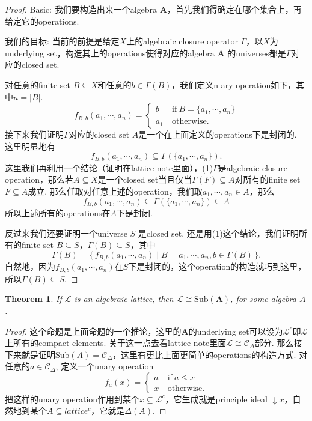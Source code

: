 \documentclass{article}
\newtheorem{theorem}{Theorem}[section]
\newcommand\Set[2]{\{\,#1\mid#2\,\}} %
\newcommand\lattice{\mathcal{L}}
\newcommand\algebra{\mathbf{A}}
\newcommand\Sub[1]{\text{Sub}(#1)}
\begin{document}
\begin{proof}
Basic: 我们要构造出来一个algebra $\algebra$，首先我们得确定在哪个集合上，再给定它的operations. 

我们的目标: 当前的前提是给定$X$上的algebraic closure operator $\Gamma$，以$X$为underlying set，构造其上的operations使得对应的algebra $\algebra$ 的universes都是$\Gamma$对应的closed set.

对任意的finite set $B \subseteq X$和任意的$b \in \Gamma(B)$，我们定义n-ary operation如下，其中$n = |B|$.
$$
f_{B,b}(a_1,\cdots,a_n) = \left\{
\begin{array}{ll} 
b \ & \text{if}\ B=\{a_1,\cdots,a_n\} \\ 
a_1\ & \text{otherwise}.  
\end{array}
\right.   
$$
接下来我们证明$\Gamma$对应的closed set $A$是一个在上面定义的operations下是封闭的. 这里明显地有
$$
f_{B,b}(a_1,\cdots,a_n) \subseteq \Gamma(\{a_1,\cdots,a_n\}).
$$
这里我们再利用一个结论（证明在lattice note里面），(1)$\Gamma$是algebraic closure operation，那么若$A \subseteq X$是一个closed set当且仅当$\Gamma(F) \subseteq A$对所有的finite set $F \subseteq A$成立. 那么任取对任意上述的operation，我们取$a_1,\cdots,a_n \in A$，那么
$$
f_{B,b}(a_1,\cdots,a_n) \subseteq \Gamma(\{a_1,\cdots,a_n\}) \subseteq A
$$
所以上述所有的operations在$A$下是封闭.

反过来我们还要证明一个universe $S$ 是closed set. 还是用(1)这个结论，我们证明所有的finite set $B \subseteq S$，$\Gamma(B) \subseteq S$，其中
$$
\Gamma(B) = \Set{f_{B,b}(a_1,\cdots,a_n)}{B={a_1,\cdots,a_n},b \in \Gamma(B)}.
$$
自然地，因为$f_{B,b}(a_1,\cdots,a_n)$在$S$下是封闭的，这个operation的构造就巧到这里，所以$\Gamma(B) \subseteq S$.
\end{proof}


\begin{theorem}
\rm If $\lattice$ is an algebraic lattice, then $\lattice \cong \Sub{\algebra}$, for some algebra $A$.
\end{theorem}

\begin{proof}
这个命题是上面命题的一个推论，这里的$\algebra$的underlying set可以设为$\lattice^c$即$\lattice$上所有的compact elements. 关于这一点去看lattice note里面$\lattice \cong \mathcal{C}_{\Delta}$部分. 那么接下来就是证明$\Sub{A} =  \mathcal{C}_{\Delta}$，这里有更比上面更简单的operations的构造方式. 对任意的$a \in \mathcal{C}_{\Delta}$, 定义一个unary operation
$$
f_{a}(x) = \left\{
\begin{array}{ll} 
a \ & \text{if}\ a \leq x \\ 
x\ & \text{otherwise}.  
\end{array}
\right.  
$$
把这样的unary operation作用到某个$x \subseteq \lattice^c$，它生成就是principle ideal $\downarrow x$，自然地到某个$A \subseteq lattice^c$，它就是$\Delta(A)$.
\end{proof}
\end{document}
